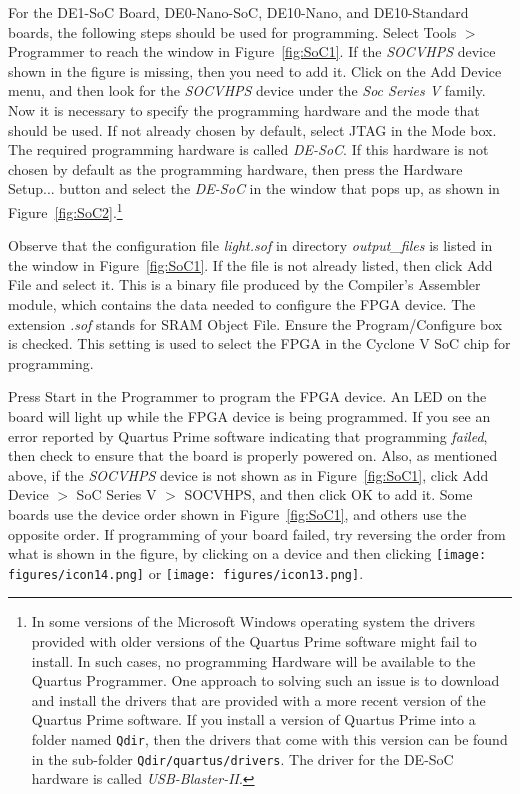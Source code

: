 For the DE1-SoC Board, DE0-Nano-SoC, DE10-Nano, and DE10-Standard boards, 
the following steps should be used for programming.  Select {\sf Tools $>$ Programmer} to reach 
the window in Figure~\ref{fig:SoC1}. If the {\it SOCVHPS} device shown in the figure is missing, 
then you need to add it. Click on the {\sf Add Device} menu, and then look for the {\it SOCVHPS}
device under the \textit{Soc Series V} family.
Now it is necessary to specify the programming hardware and 
the mode that should be used. If not already chosen by default, 
select JTAG in the {\sf Mode} box.  The required programming hardware is called {\it DE-SoC}. If
this hardware is not chosen by default as the programming
hardware, then press the {\sf Hardware Setup...} button and select the {\it DE-SoC} in the 
window that pops up, as shown in Figure~\ref{fig:SoC2}.\footnote{In some versions of the
Microsoft Windows operating system the drivers provided with older versions of the Quartus
Prime software might fail to install. In such cases, no programming Hardware will be available to
the Quartus Programmer. One approach to solving such an issue is to download and install the 
drivers that are provided with a more recent version of the Quartus Prime software.
If you install a version of Quartus Prime into a folder named
\texttt{Qdir}, then the drivers that come with this version can be found in the sub-folder
\texttt{Qdir/quartus/drivers}. The driver for the DE-SoC hardware is called {\it
USB-Blaster-II}.}  

Observe that the configuration file {\it light.sof} in directory {\it output\_files} is 
listed in the window in
Figure~\ref{fig:SoC1}. If the file is not already listed, then click {\sf Add File} 
and select it.  This is a binary file produced by the Compiler's Assembler module, 
which contains the data needed to configure the FPGA device.
The extension {\it .sof} stands for SRAM Object File.
Ensure the {\sf Program/Configure} box is checked.
This setting is used to select the FPGA in the Cyclone V SoC chip for programming.

Press {\sf Start} in the Programmer to program the FPGA device.  An LED on the board will 
light up while the FPGA device is being programmed. 
If you see an error reported by Quartus Prime software indicating that
programming {\it failed}, then check to ensure that the board is properly powered on.
Also, as mentioned above, if the {\it SOCVHPS} device is not shown as in Figure~\ref{fig:SoC1}, 
click {\sf Add Device $>$ SoC Series V $>$ SOCVHPS}, and then click {\sf OK} to add it.
Some boards use the device order shown in Figure~\ref{fig:SoC1}, and others use the
opposite order. If programming of your board failed, try reversing the order
from what is shown in the figure, by clicking on a device and then clicking 
\texttt{[image: figures/icon14.png]} or 
\texttt{[image: figures/icon13.png]}.

